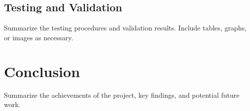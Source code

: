 \documentclass[12pt,a4paper]{article}
\begin{document}
\subsection{Testing and Validation}\label{subsec:testing}
Summarize the testing procedures and validation results. Include tables, graphs, or images as necessary.

\section{Conclusion}\label{sec:conclusion}
Summarize the achievements of the project, key findings, and potential future work. 
\end{document}
